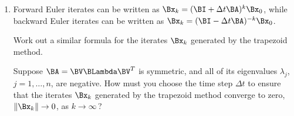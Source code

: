 \begin{enumerate}
\vspace*{1em}
\item Forward Euler iterates can be written as $\Bx_{k} = (\BI+\Delta t \BA)^k \Bx_0$,
      while backward Euler iterates can be written as $\Bx_{k} = (\BI-\Delta t \BA)^{-k} \Bx_0$.

\vspace*{.25em}
      Work out a similar formula for the iterates $\Bx_k$ generated by the trapezoid method.

\vspace*{.25em}
      Suppose $\BA = \BV\BLambda\BV^T$ is symmetric, and all of its 
      eigenvalues $\lambda_j$, $j=1,\ldots, n$, are negative.  
      How must you choose the time step $\Delta t$ to ensure that the iterates
      $\Bx_k$ generated by the trapezoid method converge to zero, $\|\Bx_k\|\to 0$,
      as $k\to\infty$\,?
\end{enumerate}

